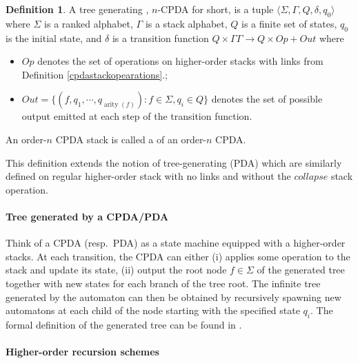 \documentclass[a4paper,draft]{article}[12pt]
\theoremstyle{remark}
\theoremstyle{definition}
\newtheorem{definition}{Definition}[section]
\newcommand\arity{\mathop{\mathrm{arity}}}
\begin{document}
\begin{definition}
	A tree generating , $n$-CPDA for short, is a tuple $\langle \Sigma, \Gamma,Q,\delta,q_0 \rangle$ where $\Sigma$ is a ranked alphabet, 
	$\Gamma$ is a stack alphabet, $Q$ is a finite set of states, $q_0$
	is the initial state, and $\delta$ is a transition function $ Q \times \Gamma Γ \longrightarrow Q \times Op + Out$ where
	\begin{itemize}
		\item  $Op$ denotes the set of operations on higher-order stacks with links from Definition \ref{cpdastackopearations}.;
		\item $Out = \{(f, q_1 , \cdots ,q_{\arity(f)})  : f \in \Sigma, q_ i \in Q \}$ denotes the set of possible output emitted at each step of the transition function.
	\end{itemize}
	An order-$n$ CPDA stack is called a  of an order-$n$ CPDA.
\end{definition}

This definition extends the notion of tree-generating  (PDA) which are similarly defined on regular higher-order stack with no links and without the $collapse$ stack operation.

\paragraph{Tree generated by a CPDA/PDA}

Think of a CPDA (resp.\ PDA) as a state machine equipped with a higher-order stacks. At each transition, the CPDA can either (i) applies some operation to the stack and update its state, (ii) output the root node $f\in \Sigma$ of the generated tree together with new states for each branch of the tree root. The infinite tree generated by the automaton can then be obtained by recursively spawning new automatons at each child of the node starting with the specified state $q_i$.
The formal definition of the generated tree can be found in \cite{KNU02,hague-collaps-full}.


\paragraph{Higher-order recursion schemes} \hfill
\end{document}
